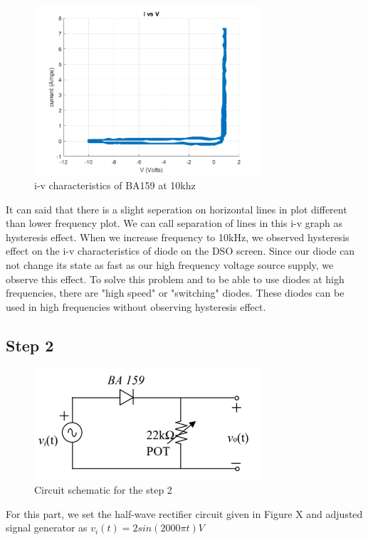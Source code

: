 \documentclass[letterpaper,12pt]{article}
\begin{document}
\begin{figure}[H]
    \centering
    \includegraphics[width = 0.75\textwidth]{1_ba159_10khz.png}
    \caption{i-v characteristics of BA159 at 10khz}
\end{figure} 
It can said that there is a slight seperation on horizontal lines in plot different than lower frequency plot. We can call separation of lines in this i-v graph as hysteresis effect. When we increase frequency to 10kHz, we observed hysteresis effect on the i-v characteristics of diode on the DSO screen. Since our diode can not change its state as fast as our high frequency voltage source supply, we observe this effect. To solve this problem and to be able to use diodes at high frequencies, there are "high speed" or "switching" diodes. These diodes can be used in high frequencies without observing hysteresis effect.

\subsection{Step 2}

\begin{figure}[H]
    \centering
    \includegraphics[width = 0.75\textwidth]{2_1.png}
    \caption{Circuit schematic for the step 2}
\end{figure} 
For this part, we set the half-wave rectifier circuit given in Figure X and adjusted signal generator as 
\(
v_i(t)  = 2sin(2000 \pi t) V 
\)
\end{document}

